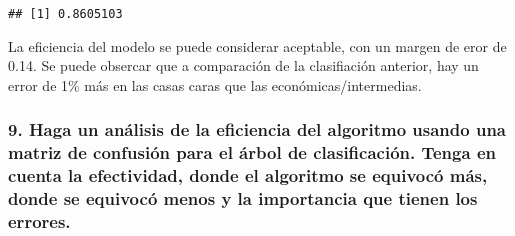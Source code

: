 \documentclass[
]{article}
\newenvironment{Shaded}{\begin{snugshade}}{\end{snugshade}}
\newcommand{\FunctionTok}[1]{\textcolor[rgb]{0.00,0.00,0.00}{#1}}
\newcommand{\NormalTok}[1]{#1}
\newcommand{\OtherTok}[1]{\textcolor[rgb]{0.56,0.35,0.01}{#1}}
\newcommand{\SpecialCharTok}[1]{\textcolor[rgb]{0.00,0.00,0.00}{#1}}
\begin{document}
\begin{verbatim}
## [1] 0.8605103
\end{verbatim}

La eficiencia del modelo se puede considerar aceptable, con un margen de
eror de 0.14. Se puede obsercar que a comparación de la clasifiación
anterior, hay un error de 1\% más en las casas caras que las
económicas/intermedias.

\hypertarget{haga-un-anuxe1lisis-de-la-eficiencia-del-algoritmo-usando-una-matriz-de-confusiuxf3n-para-el-uxe1rbol-de-clasificaciuxf3n.-tenga-en-cuenta-la-efectividad-donde-el-algoritmo-se-equivocuxf3-muxe1s-donde-se-equivocuxf3-menos-y-la-importancia-que-tienen-los-errores.}{%
\subsubsection{9. Haga un análisis de la eficiencia del algoritmo usando
una matriz de confusión para el árbol de clasificación. Tenga en cuenta
la efectividad, donde el algoritmo se equivocó más, donde se equivocó
menos y la importancia que tienen los
errores.}\label{haga-un-anuxe1lisis-de-la-eficiencia-del-algoritmo-usando-una-matriz-de-confusiuxf3n-para-el-uxe1rbol-de-clasificaciuxf3n.-tenga-en-cuenta-la-efectividad-donde-el-algoritmo-se-equivocuxf3-muxe1s-donde-se-equivocuxf3-menos-y-la-importancia-que-tienen-los-errores.}}

\begin{Shaded}
\end{Shaded}
\end{document}
